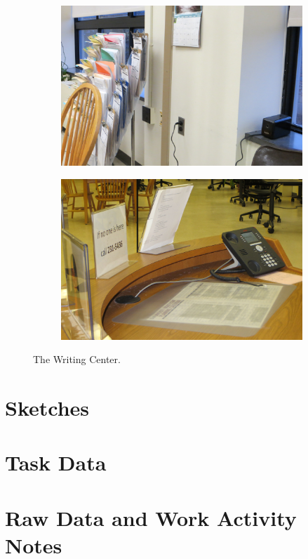 \documentclass[12pt]{article} %
\begin{document}
\begin{figure}[H]
\begin{subfigure}{.5\linewidth}
\caption{}
\label{fig:WC6}
\end{subfigure}\\[1ex]
\begin{subfigure}{.5\linewidth}
\centering
\includegraphics[width=0.75\linewidth]{WC7}
\caption{}
\label{fig:WC7}
\end{subfigure}%
\begin{subfigure}{.5\linewidth}
\centering
\includegraphics[width=0.75\linewidth]{WC8}
\caption{}
\label{fig:WC8}
\end{subfigure}
\caption{The Writing Center.}
\label{fig:TheWritingCenter}
\end{figure}

\section{Sketches}

\section{Task Data}

\section{Raw Data and Work Activity Notes}
\end{document}

